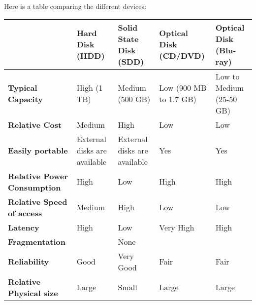   Here is a table comparing the different devices:
  \begin{table}[H]
    \centering
    \begin{tabular}{ L{3cm} | L{2.5cm} | L{3.5cm} | L{3cm} | L{3cm} }
       & \textbf{Hard Disk (HDD)} & \textbf{Solid State Disk (SDD)} & \textbf{Optical Disk (CD/DVD)} & \textbf{Optical Disk (Blu-ray)} \\ \hline
       \textbf{Typical Capacity} & High (1 TB) & Medium (500 GB) & Low (900 MB to 1.7 GB) & Low to Medium (25-50 GB) \\ \hline
       \textbf{Relative Cost} & Medium & High & Low & Low \\ \hline
       \textbf{Easily portable} & External disks are available & External disks are available & Yes & Yes \\ \hline
       \textbf{Relative Power Consumption} & High & Low & High & High \\ \hline
       \textbf{Relative Speed of access} & Medium & High & Low & Low \\ \hline
       \textbf{Latency} & High & Low & Very High & High \\ \hline
       \textbf{Fragmentation} & & None &  & \\ \hline
       \textbf{Reliability} & Good & Very Good & Fair & Fair \\ \hline
       \textbf{Relative Physical size} & Large & Small & Large & Large
    \end{tabular}
  \end{table}
